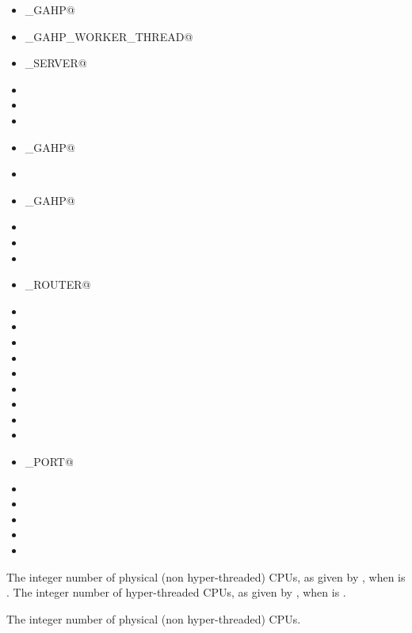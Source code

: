 \begin{description}
  \begin{itemize}
  \label{list:subsystem names}
  \item \verb@C_GAHP@
  \item \verb@C_GAHP_WORKER_THREAD@
  \item \verb@CKPT_SERVER@
  \item \verb@COLLECTOR@
  \item \verb@DBMSD@
  \item \verb@DEFRAG@
  \item {}_GAHP@
  \item \verb@GANGLIAD@
  \item \verb@GCE_GAHP@
  \item \verb@GRIDMANAGER@
  \item \verb@HAD@
  \item \verb@HDFS@
  \item \verb@JOB_ROUTER@
  \item \verb@KBDD@ 
  \item \verb@LEASEMANAGER@
  \item \verb@MASTER@
  \item \verb@NEGOTIATOR@
  \item \verb@QUILL@
  \item \verb@REPLICATION@
  \item \verb@ROOSTER@
  \item \verb@SCHEDD@
  \item \verb@SHADOW@
  \item \verb@SHARED_PORT@
  \item \verb@STARTD@
  \item \verb@STARTER@
  \item \verb@SUBMIT@
  \item \verb@TOOL@
  \item \verb@TRANSFERER@
  \end{itemize}

\label{param:DetectedCpus}
\item[\MacroU{DETECTED\_CPUS}]
  The integer number of physical (non hyper-threaded) CPUs, as given by
  , when 
  is .
  The integer number of hyper-threaded CPUs, as given by
  , when 
  is .

\label{param:DetectedPhysicalCpus}
\item[\MacroU{DETECTED\_PHYSICAL\_CPUS}]
  The integer number of physical (non hyper-threaded) CPUs.

\end{description}

